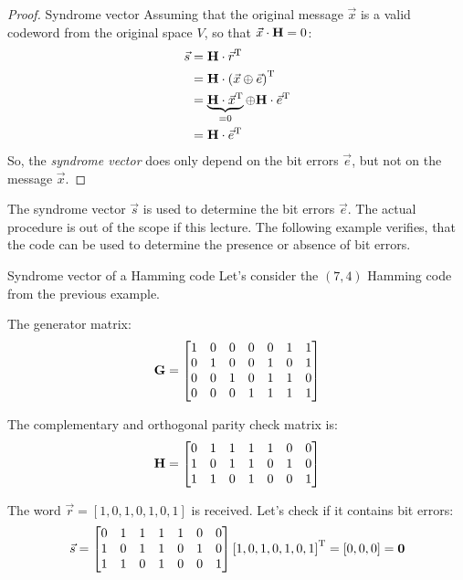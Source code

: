 \begin{refsection}
\begin{proof}{Syndrome vector}
	Assuming that the original message $\vec{x}$ is a valid codeword from the original space $V$, so that $\vec{x} \cdot \bm{\mathrm{H}} = 0$:
	\begin{equation}
		\begin{split}
			\vec{s} &= \bm{\mathrm{H}} \cdot \vec{r}^{\mathrm{T}} \\
			 &= \bm{\mathrm{H}} \cdot \left(\vec{x} \oplus \vec{e}\right)^{\mathrm{T}} \\
			 &= \underbrace{\bm{\mathrm{H}} \cdot \vec{x}^{\mathrm{T}}}_{= 0} \oplus \bm{\mathrm{H}} \cdot \vec{e}^{\mathrm{T}} \\
			 &= \bm{\mathrm{H}} \cdot \vec{e}^{\mathrm{T}}
		\end{split}
	\end{equation}
	So, the \emph{syndrome vector} does only depend on the bit errors $\vec{e}$, but not on the message $\vec{x}$.
\end{proof}

The syndrome vector $\vec{s}$ is used to determine the bit errors $\vec{e}$. The actual procedure is out of the scope if this lecture. The following example verifies, that the code can be used to determine the presence or absence of bit errors.

\begin{example}{Syndrome vector of a Hamming code}
	Let's consider the $(7,4)$ Hamming code from the previous example.
	
	The generator matrix:
	\begin{equation}
		\bm{\mathrm{G}} = \left[\begin{matrix}
			1 & 0 & 0 & 0 & 0 & 1 & 1 \\
			0 & 1 & 0 & 0 & 1 & 0 & 1 \\
			0 & 0 & 1 & 0 & 1 & 1 & 0 \\
			0 & 0 & 0 & 1 & 1 & 1 & 1
		\end{matrix}\right]
	\end{equation}

	The complementary and orthogonal parity check matrix is:
	\begin{equation}
		\bm{\mathrm{H}} = \left[\begin{matrix}
			0 & 1 & 1 & 1 & 1 & 0 & 0 \\
			1 & 0 & 1 & 1 & 0 & 1 & 0 \\
			1 & 1 & 0 & 1 & 0 & 0 & 1
		\end{matrix}\right]
	\end{equation}

	The word $\vec{r} = \left[1, 0, 1, 0, 1, 0, 1\right]$ is received. Let's check if it contains bit errors:
	\begin{equation}
		\vec{s} = \left[\begin{matrix}
			0 & 1 & 1 & 1 & 1 & 0 & 0 \\
			1 & 0 & 1 & 1 & 0 & 1 & 0 \\
			1 & 1 & 0 & 1 & 0 & 0 & 1
		\end{matrix}\right] \left[1, 0, 1, 0, 1, 0, 1\right]^{\mathrm{T}} = \left[0, 0, 0\right] = \bm{\mathrm{\mathrm{0}}}
	\end{equation}
	

\end{example}
\end{refsection}
